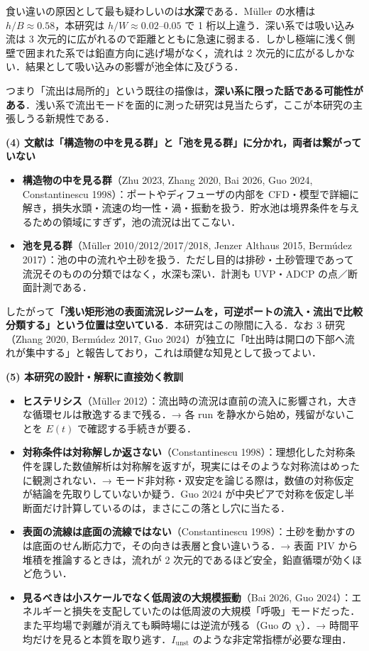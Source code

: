 \documentclass[11pt]{jsarticle}
\begin{document}
食い違いの原因として最も疑わしいのは\textbf{水深}である．M\"uller の水槽は $h/B \approx 0.58$，本研究は $h/W \approx 0.02$--$0.05$ で 1 桁以上違う．深い系では吸い込み流は 3 次元的に広がれるので距離とともに急速に弱まる．しかし極端に浅く側壁で囲まれた系では鉛直方向に逃げ場がなく，流れは 2 次元的に広がるしかない．結果として吸い込みの影響が池全体に及びうる．

つまり「流出は局所的」という既往の描像は，\textbf{深い系に限った話である可能性がある}．浅い系で流出モードを面的に測った研究は見当たらず，ここが本研究の主張しうる新規性である．

\medskip
\noindent\textbf{(4) 文献は「構造物の中を見る群」と「池を見る群」に分かれ，両者は繋がっていない}

\begin{itemize}
  \item \textbf{構造物の中を見る群}（Zhu 2023, Zhang 2020, Bai 2026, Guo 2024, Constantinescu 1998）：ポートやディフューザの内部を CFD・模型で詳細に解き，損失水頭・流速の均一性・渦・振動を扱う．貯水池は境界条件を与えるための領域にすぎず，池の流況は出てこない．
  \item \textbf{池を見る群}（M\"uller 2010/2012/2017/2018, Jenzer Althaus 2015, Berm\'udez 2017）：池の中の流れや土砂を扱う．ただし目的は排砂・土砂管理であって流況そのものの分類ではなく，水深も深い．計測も UVP・ADCP の点／断面計測である．
\end{itemize}

\noindent したがって\textbf{「浅い矩形池の表面流況レジームを，可逆ポートの流入・流出で比較分類する」という位置は空いている}．本研究はこの隙間に入る．なお 3 研究（Zhang 2020, Berm\'udez 2017, Guo 2024）が独立に「吐出時は開口の下部へ流れが集中する」と報告しており，これは頑健な知見として扱ってよい．

\medskip
\noindent\textbf{(5) 本研究の設計・解釈に直接効く教訓}

\begin{itemize}
  \item \textbf{ヒステリシス}（M\"uller 2012）：流出時の流況は直前の流入に影響され，大きな循環セルは散逸するまで残る．→ 各 run を静水から始め，残留がないことを $E(t)$ で確認する手続きが要る．
  \item \textbf{対称条件は対称解しか返さない}（Constantinescu 1998）：理想化した対称条件を課した数値解析は対称解を返すが，現実にはそのような対称流はめったに観測されない．→ モード非対称・双安定を論じる際は，数値の対称仮定が結論を先取りしていないか疑う．Guo 2024 が中央ピアで対称を仮定し半断面だけ計算しているのは，まさにこの落とし穴に当たる．
  \item \textbf{表面の流線は底面の流線ではない}（Constantinescu 1998）：土砂を動かすのは底面のせん断応力で，その向きは表層と食い違いうる．→ 表面 PIV から堆積を推論するときは，流れが 2 次元的であるほど安全，鉛直循環が効くほど危うい．
  \item \textbf{見るべきは小スケールでなく低周波の大規模振動}（Bai 2026, Guo 2024）：エネルギーと損失を支配していたのは低周波の大規模「呼吸」モードだった．また平均場で剥離が消えても瞬時場には逆流が残る（Guo の $\chi$）．→ 時間平均だけを見ると本質を取り逃す．$I_\mathrm{unst}$ のような非定常指標が必要な理由．
\end{itemize}
\end{document}
